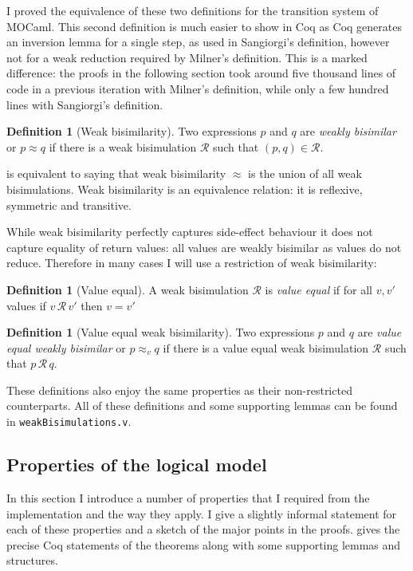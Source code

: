 \documentclass[12pt,twoside,notitlepage]{report}
\theoremstyle{plain}%
\theoremstyle{definition}
\newtheorem{defn}[thm]{Definition}
\theoremstyle{remark}
\begin{document}
I proved the equivalence of these two definitions for the transition system of MOCaml. This second definition is much easier to show in Coq as Coq generates an inversion lemma for a single step, as used in Sangiorgi's definition, however not for a weak reduction required by Milner's definition. This is a marked difference: the proofs in the following section took around five thousand lines of code in a previous iteration with Milner's definition, while only a few hundred lines with Sangiorgi's definition.
\begin{defn}[Weak bisimilarity]
\label{defn:weak_bisimilarity}
Two expressions $ p $ and $ q $ are \textit{weakly bisimilar} or $ p\approx q $ if there is a weak bisimulation $ \mathcal{R} $ such that $ (p,q) \in \mathcal{R} $.
\end{defn}

 is equivalent to saying that weak bisimilarity $ \approx  $ is the union of all weak bisimulations. Weak bisimilarity is an equivalence relation: it is reflexive, symmetric and transitive.

While weak bisimilarity perfectly captures side-effect behaviour it does not capture equality of return values: all values are weakly bisimilar as values do not reduce. Therefore in many cases I will use a restriction of weak bisimilarity:

\begin{defn}[Value equal]
\label{defn:ve_weak_bisim}
A weak bisimulation $ \mathcal{R} $ is \textit{value equal} if for all $ v, v' $ values if $ v\,\mathcal{R}\,v' $ then $ v = v' $
\end{defn}

\begin{defn}[Value equal weak bisimilarity]
\label{defn:ve_weak_bisimilarity}
Two expressions $ p $ and $ q $ are \textit{value equal weakly bisimilar} or $ p\approx_v q $ if there is a value equal weak bisimulation $ \mathcal{R} $ such that $ p\, \mathcal{R} \, q $.
\end{defn}

These definitions also enjoy the same properties as their non-restricted counterparts. All of these definitions and some supporting lemmas can be found in \verb|weakBisimulations.v|.
\subsection{Properties of the logical model}

In this section I introduce a number of properties that I required from the implementation and the way they apply. I give a slightly informal statement for each of these properties and a sketch of the major points in the proofs.  gives the precise Coq statements of the theorems along with some supporting lemmas and structures. 
\end{document}
